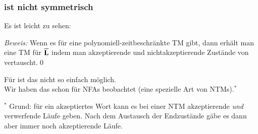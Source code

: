 \documentclass[aspectratio=1610,onlymath]{beamer}
\begin{document}
\begin{frame}\frametitle{ ist nicht symmetrisch}

Es ist leicht zu sehen:


\emph{Beweis:} Wenn es für  eine polynomiell-zeitbeschränkte TM 
gibt, dann erhält man eine TM für $\overline{\textbf{\textcolor{black}{L}}}$ indem man akzeptierende
und nichtakzeptierende Zustände von  vertauscht.\qed
\medskip\pause

Für  ist das nicht so einfach möglich. \\
Wir haben das schon für NFAs beobachtet (eine spezielle Art von NTMs).${}^*$



{\tiny ${}^*$ Grund: für ein akzeptiertes Wort kann es bei einer NTM akzeptierende \emph{und} verwerfende Läufe geben. Nach dem Austausch der Endzustände gäbe es dann aber immer noch akzeptierende Läufe.\\
}

\end{frame}
\end{document}
